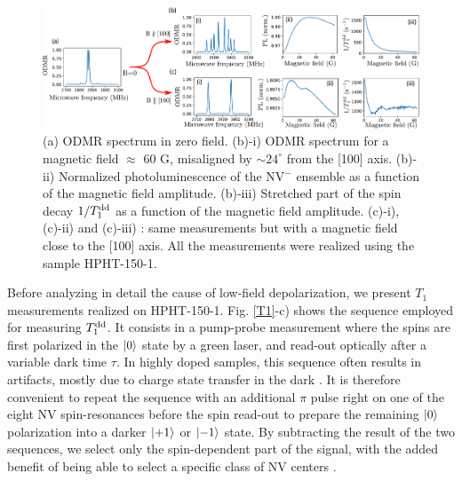 \documentclass[preprintnumbers,amsmath,amssymb,superscriptaddress,twocolumn,showpacs]{revtex4-2}
\begin{document}
\begin{figure}
\includegraphics[width=.95\textwidth]{Figures/fig_100_vs_1x1x1x1.pdf}
\caption{(a) ODMR spectrum in zero field. (b)-i) ODMR spectrum for a magnetic field $\approx$ 60 G, misaligned by $\sim  24^\circ$ from the [100] axis. (b)-ii) Normalized photoluminescence of the NV$^-$ ensemble as a function of the magnetic field amplitude. (b)-iii) Stretched part of the spin decay $1/T_1^{\rm dd}$ as a function of the magnetic field amplitude. (c)-i), (c)-ii) and (c)-iii) : same measurements but with a magnetic field close to the [100] axis. All the measurements were realized using the sample HPHT-150-1. }
\label{100_VS_1x4}
\end{figure}

Before analyzing in detail the cause of low-field depolarization, we present $T_1$ measurements realized on HPHT-150-1. Fig. \ref{T1}-c) shows the sequence employed for measuring $T_1^{\rm dd}$. 
It consists in a pump-probe measurement where the spins are first polarized in the $\ket{0}$ state by a green laser, and read-out optically after a variable dark time $\tau$. In highly doped samples, this sequence often results in artifacts, mostly due to charge state transfer in the dark \citep{giri_coupled_2018, giri_selective_2019}. It is therefore convenient to repeat the sequence with an additional $\pi$ pulse right on one of the eight NV spin-resonances before the spin read-out to prepare the remaining $\ket{0}$ polarization into a darker $\ket{+1}$ or $\ket{-1}$ state. By subtracting the result of the two sequences, we select only the spin-dependent part of the signal, with the added benefit of being able to select a specific class of NV centers \citep{jarmola_temperature-_2012, mrozek_longitudinal_2015, choi2017depolarization}. 
\end{document}
